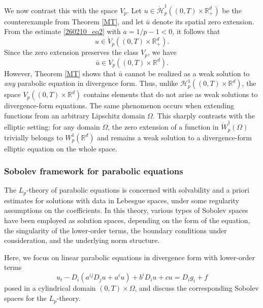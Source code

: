 \documentclass[reqno]{amsart}
\numberwithin{equation}{section}
\theoremstyle{plain}
\theoremstyle{definition}
\def\bR{\mathbb{R}}
\def\cH{\mathcal{H}}
\begin{document}
We now contrast this with the space $V_p$.
Let $u\in \mathring{\cH}^1_p((0,T)\times \bR^d_+)$ be the counterexample from Theorem \ref{MT}, and let $\bar{u}$ denote its spatial zero extension.
From the estimate \eqref{260210_eq2} with $a=1/p-1<0$, it follows that 
$$
u\in \mathring{V}_p((0,T)\times \bR^d_+).
$$
Since the zero extension preserves the class $V_p$, we have
\[
\bar u\in V_p((0,T)\times \bR^d).
\]
However, Theorem \ref{MT} shows that $\bar u$ cannot be realized as a weak solution to \emph{any} parabolic equation in divergence form. 
Thus, unlike $\cH^1_p((0,T)\times \bR^d)$, 
the space $V_p((0,T)\times \bR^d)$ contains elements that do not arise as weak solutions to divergence-form equations.
The same phenomenon occurs when extending functions from an arbitrary Lipschitz domain $\Omega$.
This sharply contrasts with the elliptic setting:
for any domain $\Omega$, the zero extension of a function in $\mathring{W}^1_p(\Omega)$ trivially belongs to $W^1_p(\bR^d)$ and remains a weak solution to a divergence-form elliptic equation on the whole space.

\subsubsection{Sobolev framework for parabolic equations}			\label{S1_4_2}

The $L_p$-theory of parabolic equations is concerned with solvability and a priori estimates for solutions with data in Lebesgue spaces, under some regularity assumptions on the coefficients. 
In this theory, various types of Sobolev spaces have been employed as solution spaces, depending on the form of the equation, the singularity of the lower-order terms,  the boundary conditions under consideration, and the underlying norm structure.

Here, we focus on linear parabolic equations in divergence form with lower-order terms
\begin{equation}		\label{260223_eq1}
u_t-D_i(a^{ij}D_j u+a^iu)+b^iD_iu+cu=D_i g_i+f
\end{equation}
posed in a cylindrical domain $(0,T)\times \Omega$, and discuss the corresponding Sobolev spaces for the $L_p$-theory.
\end{document}

